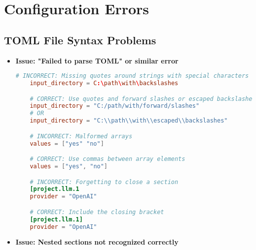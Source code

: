
\section{Configuration Errors}

\subsection{TOML File Syntax Problems}

\begin{itemize}
    \item \textbf{Issue: "Failed to parse TOML" or similar error}

    \begin{configbox}
    \begin{lstlisting}[language=TOML]
    # INCORRECT: Missing quotes around strings with special characters
    input_directory = C:\path\with\backslashes

    # CORRECT: Use quotes and forward slashes or escaped backslashes
    input_directory = "C:/path/with/forward/slashes"
    # OR
    input_directory = "C:\\path\\with\\escaped\\backslashes"

    # INCORRECT: Malformed arrays
    values = ["yes" "no"]

    # CORRECT: Use commas between array elements
    values = ["yes", "no"]

    # INCORRECT: Forgetting to close a section
    [project.llm.1
    provider = "OpenAI"

    # CORRECT: Include the closing bracket
    [project.llm.1]
    provider = "OpenAI"
    \end{lstlisting}
    \end{configbox}


    \item \textbf{Issue: Nested sections not recognized correctly}

\end{itemize}

